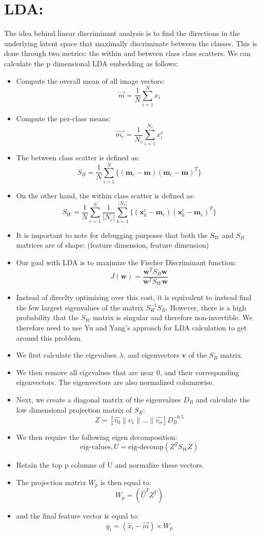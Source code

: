 \documentclass{article}
\begin{document}
\section{LDA:}
The idea behind linear discriminant analysis is to find the directions in the underlying latent space that maximally discriminate between the classes. This is done through two metrics: the within and between class class scatters. We can calculate the p dimensional LDA embedding as follows:

\begin{itemize}
    \item Compute the overall mean of all image vectors:
        \[\vec{m} = \frac{1}{N} \sum_{i=1}^{N} x_i\]
    \item Compute the per-class means:
        \[\vec{m_c} = \frac{1}{N_c} \sum_{i=1}^{N_c} x_i^c\]
    \item The between class scatter is defined as:
        \[S_B = \frac{1}{N} \sum_{i=1}^{N} \{ (\mathbf{m}_c - \mathbf{m})(\mathbf{m}_c - \mathbf{m})^T \}\]
    \item On the other hand, the within class scatter is defined as:
        \[S_W = \frac{1}{N} \sum_{c=1}^{N} \frac{1}{|N_c|} \sum_{k=1}^{|N_c|} \{ (\mathbf{x}_k^c - \mathbf{m}_c)(\mathbf{x}_k^c - \mathbf{m}_c)^T \}\]
    \item It is important to note for debugging purposes that both the $S_W$ and $S_B$ matrices are of shape: (feature dimension, feature dimension)
    \item Our goal with LDA is to maximize the Fischer Discriminant function:
        \[J(\mathbf{w}) = \frac{\mathbf{w}^T S_B \mathbf{w}}{\mathbf{w}^T S_W \mathbf{w}}\]
    \item Instead of direclty optimizing over this cost, it is equivalent to instead find the few largest eigenvalues of the matrix $S_W^{-1} S_B$. However, there is a high probability that the $S_W$ matrix is singular and therefore non-invertible. We therefore need to use Yu and Yang's approach for LDA calculation to get around this problem.
    \item We first calculate the eigevalues $\lambda$, and eigenvectors $\boldsymbol{v}$ of the $S_B$ matrix.
    \item We then remove all eigevalues that are near 0, and their corresponding eigenvectors. The eigenvectors are also normalized columnwise.
    \item Next, we create a diagonal matrix of the eigenvalues $D_B$ and calculate the low dimensional projection matrix of $S_B$:
        \[Z = \left[\hat{v_0} \| \hat{v_1} \| ... \| \hat{v_n}\right] D_B^{-0.5}\]
    \item We then require the following eigen decomposition:
        \[\text{eig-values}, U = \text{eig-decomp} \left(Z^T S_W Z\right)\]
    \item Retain the top p columns of U and normalize these vectors.
    \item The projection matrix $W_p$ is then equal to:
        \[W_p = \left( \hat{U}^T Z^T \right)\]
    \item and the final feature vector is equal to:
        \[y_i = \left(\hat{x}_i - \vec{m}\right) \times W_p\]
\end{itemize}
\end{document}
